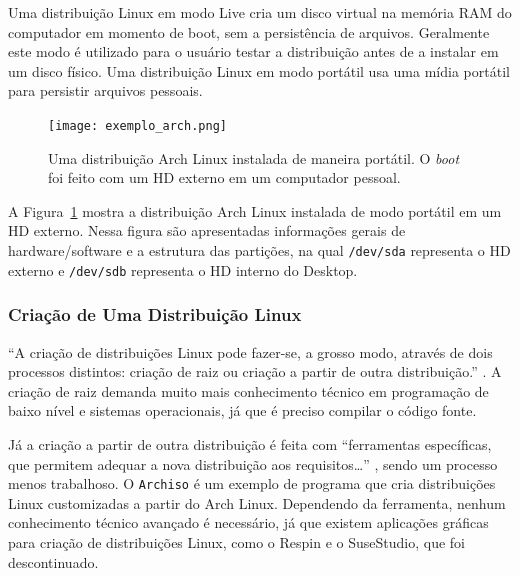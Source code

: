 \documentclass[
article,			%
12pt,				%
openright,			%
oneside,			%
a4paper,			%
chapter=TITLE,		%
section=TITLE,		%
subsection=TITLE,	%
subsubsection=TITLE,%
subsubsubsection=TITLE, %
english,			%
brazil,				%
]{abntex2}
\def\code#1{\texttt{#1}}
\begin{document}

Uma distribuição Linux em modo Live cria um disco virtual na memória
RAM do computador em momento de boot, sem a persistência de arquivos.
Geralmente este modo é utilizado para o usuário testar a distribuição
antes de a instalar em um disco físico. Uma distribuição Linux em modo
portátil usa uma mídia portátil para persistir arquivos pessoais.

\begin{figure}[H]
    \caption[Uma distribuição Arch Linux
        instalada de maneira portátil]{\label{fig:exemplo-distro}Uma distribuição Arch Linux
        instalada de maneira portátil. O \emph{boot} foi feito com um HD
    externo em um computador pessoal.}
    \begin{center}
        \texttt{[image: exemplo\_arch.png]}
    \end{center}
\end{figure}

A Figura~\ref{fig:exemplo-distro} mostra a distribuição Arch Linux
instalada de modo portátil em um HD externo. Nessa figura são
apresentadas informações gerais de hardware/software e a
estrutura das partições, na qual \code{/dev/sda} representa o HD
externo e \code{/dev/sdb} representa o HD interno do Desktop.

\subsubsection{Criação de Uma Distribuição
Linux}\label{cap:distribuicoes-linux}

``A criação  de  distribuições  Linux pode fazer-se, a grosso modo,
através  de  dois processos distintos: criação de raiz ou criação a
partir de outra distribuição.'' \cite[p.  78]{Nunes2009}. A criação de
raiz demanda muito mais conhecimento técnico em programação de baixo
nível e sistemas operacionais, já que é preciso compilar o código
fonte.

Já a criação a partir de outra distribuição é feita com ``ferramentas
específicas, que  permitem adequar  a  nova  distribuição  aos
requisitos\ldots'' \cite[p. 78]{Nunes2009}, sendo um processo menos
trabalhoso. O \code{Archiso} é um exemplo de programa que cria
distribuições Linux customizadas a partir do Arch Linux. Dependendo da
ferramenta, nenhum conhecimento técnico avançado é necessário, já que
existem aplicações gráficas para criação de distribuições Linux, como
o Respin \cite{Respin2018} e o SuseStudio, que foi descontinuado.
\end{document}
